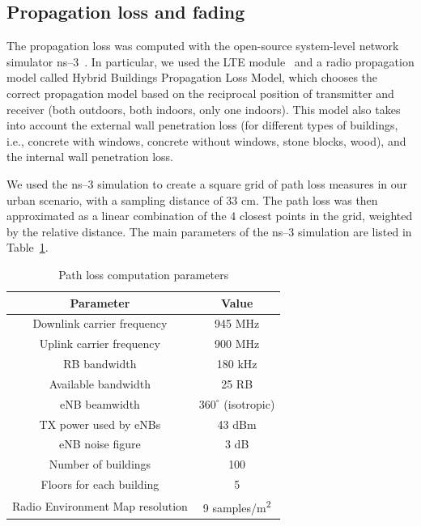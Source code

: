 \documentclass[conference, a4paper]{IEEEtran}
\begin{document}
\subsection{Propagation loss and fading}

The propagation loss was computed with the open-source system-level network simulator ns--3~\cite{ns3}. In particular, we used the LTE module~\cite{lena} and a radio propagation model called Hybrid Buildings Propagation Loss Model, which chooses the correct propagation model based on the reciprocal position of transmitter and receiver (both outdoors, both indoors, only one indoors). This model also takes into account the external wall penetration loss (for different types of buildings, i.e., concrete with windows, concrete without windows, stone blocks, wood), and the internal wall penetration loss.

We used the ns--3 simulation to create a square grid of path loss measures in our urban scenario, with a sampling distance of 33 cm. The path loss was then approximated as a linear combination of the 4 closest points in the grid, weighted by the relative distance. The main parameters of the ns--3 simulation are listed in Table~\ref{table:param}.

\begin{table}[!b]
\centering

\caption{Path loss computation parameters} %
\label{table:param}

\begin{tabular}{c|c}

\toprule
Parameter 						&	Value 			\\
\midrule
Downlink carrier frequency 		& 945 MHz			\\
Uplink carrier frequency		& 900 MHz			\\
RB bandwidth					& 180 kHz			\\
Available bandwidth				&  25 RB 			\\
eNB beamwidth					&  $360^{\circ}$ (isotropic)			\\
TX power used by eNBs 			&  43 dBm 			\\
eNB noise figure				&	3 dB 			\\
Number of buildings				&	100 				\\
Floors for each building		&	5 				\\
Radio Environment Map resolution & 9 samples/m\textsuperscript{2} \\
\bottomrule

\end{tabular}

\end{table}
\end{document}
